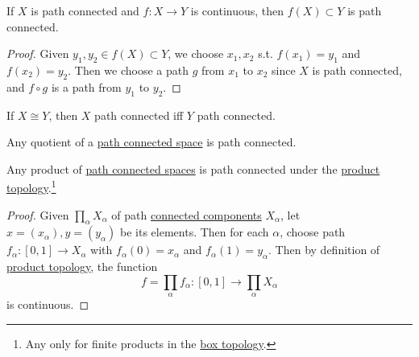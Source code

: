   \begin{theorem}
    \label{thm:continuous-images-of-path-connected-spaces-as}
    If $X$ is path connected and $f: X \rightarrow Y$ is continuous, then $f(X) \subset Y$ is path connected. 
  \end{theorem}
  \begin{proof}
    Given $y_1, y_2 \in f(X) \subset Y$, we choose $x_1, x_2$ s.t. $f(x_1) = y_1$ and $f(x_2) = y_2$. Then we choose a path $g$ from $x_1$ to $x_2$ since $X$ is path connected, and $f \circ g$ is a path from $y_1$ to $y_2$. 
  \end{proof}

  \begin{corollary}
    \label{thm:path-connectedness-is-a-topological-property}
    If $X \cong Y$, then $X$ path connected iff $Y$ path connected. 
  \end{corollary}

  \begin{corollary}
    \label{thm:quotients-path-connected-spaces-are-path}
    Any quotient of a \hyperref[def:path-connected-space]{path connected space} is path connected. 
  \end{corollary}

  \begin{theorem}
    \label{thm:products-of-path-connected-spaces}
    Any product of \hyperref[def:path-connected-space]{path connected spaces} is path connected under the \hyperref[def:product-topology]{product topology}.\footnote{Any only for finite products in the \hyperref[def:box-topology]{box topology}.}
  \end{theorem}
  \begin{proof}
    Given $\prod_\alpha X_\alpha$ of path \hyperref[def:connected-components]{connected components} $X_\alpha$, let $x = (x_\alpha), y = (y_\alpha)$ be its elements. Then for each $\alpha$, choose path $f_\alpha: [0, 1] \rightarrow X_\alpha$ with $f_\alpha (0) = x_\alpha$ and $f_\alpha (1) = y_\alpha$. Then by definition of \hyperref[def:product-topology]{product topology}, the function 
    \begin{equation}
      f = \prod_\alpha f_\alpha : [0, 1] \rightarrow \prod_\alpha X_\alpha
    \end{equation}
    is continuous. 
  \end{proof}


